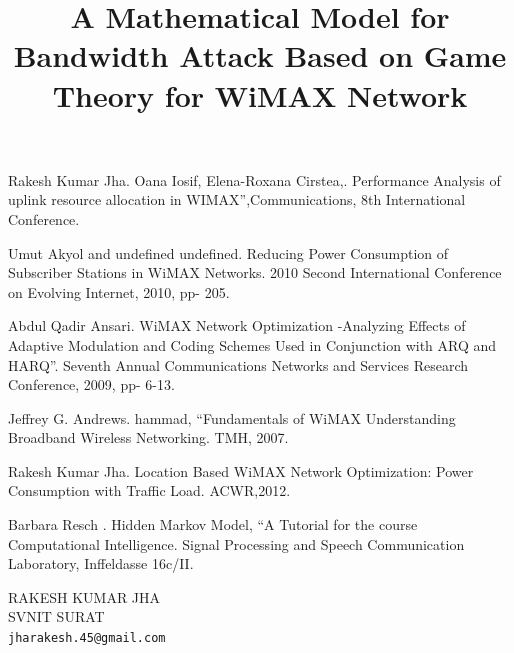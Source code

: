 \documentclass[article,A4,11pt]{llncs}%
\begin{document}

\begin{thebibliography}{10}
{\sc Rakesh Kumar Jha}. {Oana Iosif, Elena-Roxana Cirstea,}. Performance Analysis of uplink resource allocation in WIMAX”,Communications, 8th International Conference.

{\sc Umut Akyol and undefined undefined}. {Reducing Power Consumption of Subscriber Stations in WiMAX Networks}. 2010 Second International Conference on Evolving Internet, 2010, pp- 205.

{\sc Abdul Qadir Ansari}. {WiMAX Network Optimization -Analyzing Effects of Adaptive Modulation and Coding Schemes Used in Conjunction with ARQ and HARQ”}. Seventh Annual Communications Networks and Services Research Conference, 2009, pp- 6-13.

{\sc Jeffrey G. Andrews}. {hammad, “Fundamentals of WiMAX Understanding Broadband Wireless Networking}. TMH, 2007.

{\sc Rakesh Kumar Jha}. {Location Based WiMAX Network Optimization: Power Consumption with Traffic Load}. ACWR,2012.

{\sc Barbara Resch }. {Hidden Markov Model, “A Tutorial for the course Computational Intelligence}. Signal Processing and Speech Communication Laboratory, Inffeldasse 16c/II.
\end{thebibliography}

\title{A Mathematical Model for Bandwidth Attack Based on Game Theory for WiMAX Network}
 \author{} \institute{}
\maketitle
\begin{center}
{\large RAKESH KUMAR JHA}\\
SVNIT SURAT\\
{\tt jharakesh.45@gmail.com}
\end{center}
\end{document}
